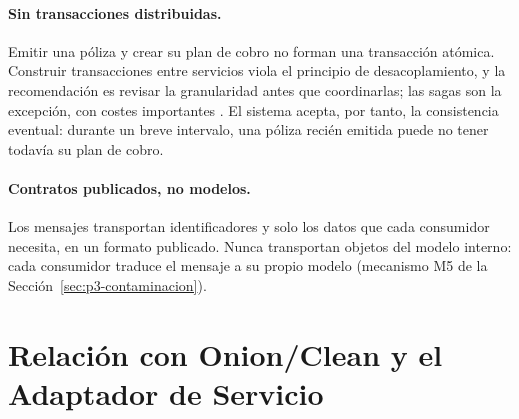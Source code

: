 \paragraph{Sin transacciones distribuidas.}
Emitir una póliza y crear su plan de cobro no forman una transacción atómica. Construir
transacciones entre servicios viola el principio de desacoplamiento, y la recomendación
es revisar la granularidad antes que coordinarlas; las sagas son la excepción, con
costes importantes \parencite[cap.~17]{richardsford2020}. El sistema acepta, por tanto,
la consistencia eventual: durante un breve intervalo, una póliza recién emitida puede no
tener todavía su plan de cobro.

\paragraph{Contratos publicados, no modelos.}
Los mensajes transportan identificadores y solo los datos que cada consumidor necesita, en
un formato publicado.
Nunca transportan objetos del modelo interno: cada consumidor traduce el mensaje a su
propio modelo (mecanismo M5 de la Sección~\ref{sec:p3-contaminacion}).

\section{Relación con Onion/Clean y el Adaptador de Servicio}
\label{sec:p3-arquitectura}

